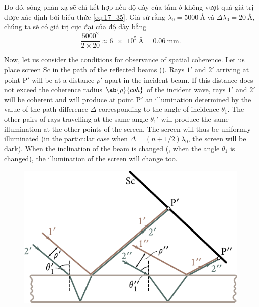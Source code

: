 Do đó, sóng phản xạ sẽ chỉ kết hợp nếu độ dày của tấm $b$ không vượt quá giá trị được xác định bởi biểu thức \eqref{eq:17_35}.
Giả sử rằng $\lambda_0=\SI{5000}{\angstrom}$ và $\Delta{\lambda_0}=\SI{20}{\angstrom}$, chúng ta sẽ có giá trị cực đại của độ dày bằng
\begin{equation}\label{eq:17_36}
    \frac{5000^2}{2 \times 20} \approx \SI{6e5}{\angstrom} = \SI{0.06}{\milli\metre}.
\end{equation}

Now, let us consider the conditions for observance of spatial coherence.
Let us place screen Sc in the path of the reflected beams ().
Rays $1'$ and $2'$ arriving at point P$'$ will be at a distance $\rho'$ apart in the incident beam.
If this distance does not exceed the coherence radius $\ab{\rho}{coh}$ of the incident wave, rays $1'$ and $2'$ will be coherent and will produce at point P$'$ an illumination determined by the value of the path difference $\Delta$ corresponding to the angle of incidence $\theta_1$.
The other pairs of rays travelling at the same angle $\theta_1'$ will produce the same illumination at the other points of the screen.
The screen will thus be uniformly illuminated (in the particular case when $\Delta=(n+1/2)\lambda_0$, the screen will be dark).
When the inclination of the beam is changed (\ie, when the angle $\theta_1$ is changed), the illumination of the screen will change too.

\begin{figure}[!htb]
	\begin{center}
		\includegraphics[scale=1]{figures/ch_17/fig_17_11.pdf}
		\caption[]{}
		\label{fig:17_11}
	\end{center}
	\vspace{-0.8cm}
\end{figure}

